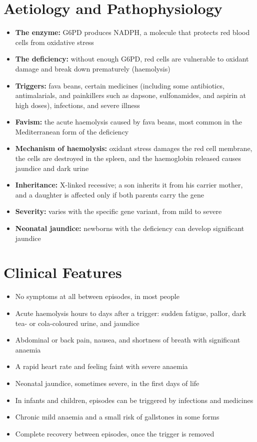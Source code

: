 \section*{Aetiology and Pathophysiology}
\begin{itemize}
    \item \textbf{The enzyme:} G6PD produces NADPH, a molecule that protects red blood cells from oxidative stress
    \item \textbf{The deficiency:} without enough G6PD, red cells are vulnerable to oxidant damage and break down prematurely (haemolysis)
    \item \textbf{Triggers:} fava beans, certain medicines (including some antibiotics, antimalarials, and painkillers such as dapsone, sulfonamides, and aspirin at high doses), infections, and severe illness
    \item \textbf{Favism:} the acute haemolysis caused by fava beans, most common in the Mediterranean form of the deficiency
    \item \textbf{Mechanism of haemolysis:} oxidant stress damages the red cell membrane, the cells are destroyed in the spleen, and the haemoglobin released causes jaundice and dark urine
    \item \textbf{Inheritance:} X-linked recessive; a son inherits it from his carrier mother, and a daughter is affected only if both parents carry the gene
    \item \textbf{Severity:} varies with the specific gene variant, from mild to severe
    \item \textbf{Neonatal jaundice:} newborns with the deficiency can develop significant jaundice
\end{itemize}

\section*{Clinical Features}
\begin{itemize}
    \item No symptoms at all between episodes, in most people
    \item Acute haemolysis hours to days after a trigger: sudden fatigue, pallor, dark tea- or cola-coloured urine, and jaundice
    \item Abdominal or back pain, nausea, and shortness of breath with significant anaemia
    \item A rapid heart rate and feeling faint with severe anaemia
    \item Neonatal jaundice, sometimes severe, in the first days of life
    \item In infants and children, episodes can be triggered by infections and medicines
    \item Chronic mild anaemia and a small risk of gallstones in some forms
    \item Complete recovery between episodes, once the trigger is removed
\end{itemize}

